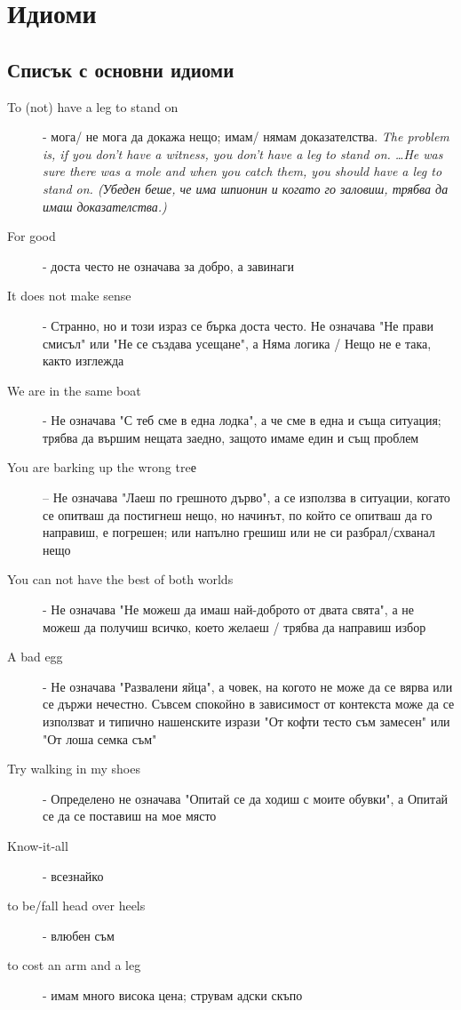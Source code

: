 \chapter{Идиоми}
\section{Списък с основни идиоми}
\begin{description}
    \item[To (not) have a leg to stand on] - мога/ не мога да докажа нещо; имам/ нямам доказателства.\textit{ The problem is, if you don't have a witness, you don't have a leg to stand on. \dots He was sure there was a mole and when you catch them, you should have a leg to stand on. (Убеден беше, че има шпионин и когато го заловиш, трябва да имаш доказателства.)}
    \item[For good] - доста често не означава за добро, а завинаги
    \item[It does not make sense] - Странно, но и този израз се бърка доста често. Не означава "Не прави смисъл" или "Не се създава усещане", а Няма логика / Нещо не е така, както изглежда
    \item[We are in the same boat] - Не означава "С теб сме в една лодка", а че сме в една и съща ситуация; трябва да вършим нещата заедно, защото имаме един и същ проблем
    \item[You are barking up the wrong treе] – Не означава "Лаеш по грешното дърво", а се използва в ситуации, когато се опитваш да постигнеш нещо, но начинът, по който се опитваш да го направиш, е погрешен; или напълно грешиш или не си разбрал/схванал нещо
    \item[You can not have the best of both worlds] - Не означава "Не можеш да имаш най-доброто от двата свята", а не можеш да получиш всичко, което желаеш / трябва да направиш избор
    \item[A bad egg] - Не означава "Развалени яйца", а човек, на когото не може да се вярва или се държи нечестно. Съвсем спокойно в зависимост от контекста може да се използват и типично нашенските изрази "От кофти тесто съм замесен" или "От лоша семка съм"
    \item[Try walking in my shoes] - Определено не означава "Опитай се да ходиш с моите обувки", а Опитай се да се поставиш на мое място
    \item[Know-it-all] - всезнайко
    \item[to be/fall head over heels] - влюбен съм
    \item[to cost an arm and a leg] - имам много висока цена; струвам адски скъпо

\end{description}
